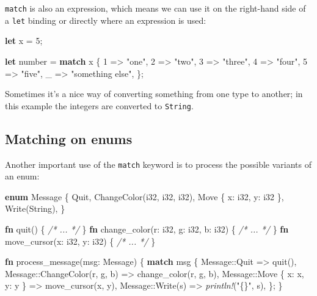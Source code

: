 \documentclass[a4paper,]{book}
\newenvironment{Shaded}{\begin{snugshade}}{\end{snugshade}}
\newcommand{\KeywordTok}[1]{\textcolor[rgb]{0.13,0.29,0.53}{\textbf{{#1}}}}
\newcommand{\DataTypeTok}[1]{\textcolor[rgb]{0.13,0.29,0.53}{{#1}}}
\newcommand{\DecValTok}[1]{\textcolor[rgb]{0.00,0.00,0.81}{{#1}}}
\newcommand{\StringTok}[1]{\textcolor[rgb]{0.31,0.60,0.02}{{#1}}}
\newcommand{\CommentTok}[1]{\textcolor[rgb]{0.56,0.35,0.01}{\textit{{#1}}}}
\newcommand{\PreprocessorTok}[1]{\textcolor[rgb]{0.56,0.35,0.01}{\textit{{#1}}}}
\newcommand{\NormalTok}[1]{{#1}}
\begin{document}
\texttt{match} is also an expression, which means we can use it on the
right-hand side of a \texttt{let} binding or directly where an
expression is used:

\begin{Shaded}
\begin{Highlighting}[]
\KeywordTok{let} \NormalTok{x = }\DecValTok{5}\NormalTok{;}

\KeywordTok{let} \NormalTok{number = }\KeywordTok{match} \NormalTok{x \{}
    \DecValTok{1} \NormalTok{=> }\StringTok{"one"}\NormalTok{,}
    \DecValTok{2} \NormalTok{=> }\StringTok{"two"}\NormalTok{,}
    \DecValTok{3} \NormalTok{=> }\StringTok{"three"}\NormalTok{,}
    \DecValTok{4} \NormalTok{=> }\StringTok{"four"}\NormalTok{,}
    \DecValTok{5} \NormalTok{=> }\StringTok{"five"}\NormalTok{,}
    \NormalTok{_ => }\StringTok{"something else"}\NormalTok{,}
\NormalTok{\};}
\end{Highlighting}
\end{Shaded}

Sometimes it's a nice way of converting something from one type to
another; in this example the integers are converted to \texttt{String}.

\subsection{Matching on enums}\label{matching-on-enums}

Another important use of the \texttt{match} keyword is to process the
possible variants of an enum:

\begin{Shaded}
\begin{Highlighting}[]
\KeywordTok{enum} \NormalTok{Message \{}
    \NormalTok{Quit,}
    \NormalTok{ChangeColor(}\DataTypeTok{i32}\NormalTok{, }\DataTypeTok{i32}\NormalTok{, }\DataTypeTok{i32}\NormalTok{),}
    \NormalTok{Move \{ x: }\DataTypeTok{i32}\NormalTok{, y: }\DataTypeTok{i32} \NormalTok{\},}
    \NormalTok{Write(}\DataTypeTok{String}\NormalTok{),}
\NormalTok{\}}

\KeywordTok{fn} \NormalTok{quit() \{ }\CommentTok{/* ... */} \NormalTok{\}}
\KeywordTok{fn} \NormalTok{change_color(r: }\DataTypeTok{i32}\NormalTok{, g: }\DataTypeTok{i32}\NormalTok{, b: }\DataTypeTok{i32}\NormalTok{) \{ }\CommentTok{/* ... */} \NormalTok{\}}
\KeywordTok{fn} \NormalTok{move_cursor(x: }\DataTypeTok{i32}\NormalTok{, y: }\DataTypeTok{i32}\NormalTok{) \{ }\CommentTok{/* ... */} \NormalTok{\}}

\KeywordTok{fn} \NormalTok{process_message(msg: Message) \{}
    \KeywordTok{match} \NormalTok{msg \{}
        \NormalTok{Message::Quit => quit(),}
        \NormalTok{Message::ChangeColor(r, g, b) => change_color(r, g, b),}
        \NormalTok{Message::Move \{ x: x, y: y \} => move_cursor(x, y),}
        \NormalTok{Message::Write(s) => }\PreprocessorTok{println!}\NormalTok{(}\StringTok{"\{\}"}\NormalTok{, s),}
    \NormalTok{\};}
\NormalTok{\}}
\end{Highlighting}
\end{Shaded}
\end{document}
